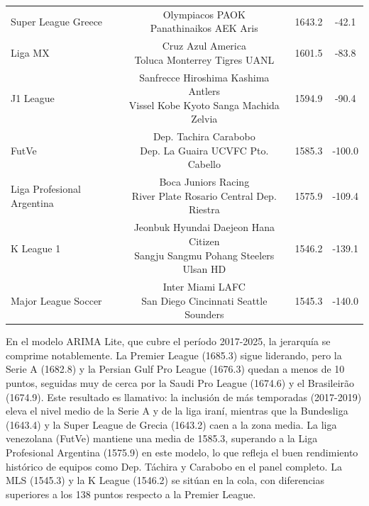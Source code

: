 \begin{table}[htbp]
{\begin{tabular}{l c c c}
			Super League Greece & \makecell[l]{Olympiacos PAOK \\ Panathinaikos AEK Aris} & 1643.2 & -42.1 \\
			Liga MX & \makecell[l]{Cruz Azul America \\ Toluca Monterrey Tigres UANL} & 1601.5 & -83.8 \\
			J1 League & \makecell[l]{Sanfrecce Hiroshima Kashima Antlers \\ Vissel Kobe Kyoto Sanga Machida Zelvia} & 1594.9 & -90.4 \\
			FutVe & \makecell[l]{Dep. Tachira Carabobo \\ Dep. La Guaira UCVFC Pto. Cabello} & 1585.3 & -100.0 \\
			Liga Profesional Argentina & \makecell[l]{Boca Juniors Racing \\ River Plate Rosario Central Dep. Riestra} & 1575.9 & -109.4 \\
			K League 1 & \makecell[l]{Jeonbuk Hyundai Daejeon Hana Citizen \\ Sangju Sangmu Pohang Steelers Ulsan HD} & 1546.2 & -139.1 \\
			Major League Soccer & \makecell[l]{Inter Miami LAFC \\ San Diego Cincinnati Seattle Sounders} & 1545.3 & -140.0 \\
			\bottomrule
	\end{tabular}}%
\end{table}

En el modelo ARIMA Lite, que cubre el per\'iodo 2017-2025, la jerarqu\'ia se comprime notablemente. La Premier League (1685.3) sigue liderando, pero la Serie A (1682.8) y la Persian Gulf Pro League (1676.3) quedan a menos de 10 puntos, seguidas muy de cerca por la Saudi Pro League (1674.6) y el Brasileir\~ao (1674.9). Este resultado es llamativo: la inclusi\'on de m\'as temporadas (2017-2019) eleva el nivel medio de la Serie A y de la liga iran\'i, mientras que la Bundesliga (1643.4) y la Super League de Grecia (1643.2) caen a la zona media. La liga venezolana (FutVe) mantiene una media de 1585.3, superando a la Liga Profesional Argentina (1575.9) en este modelo, lo que refleja el buen rendimiento hist\'orico de equipos como Dep. T\'achira y Carabobo en el panel completo. La MLS (1545.3) y la K League (1546.2) se sit\'uan en la cola, con diferencias superiores a los 138 puntos respecto a la Premier League.

